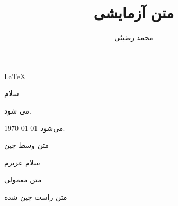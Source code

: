 \documentclass[12pt]{article}
\title{متن آزمایشی}
\author{محمد رضیئی}
\begin{document}
\maketitle

\LaTeX

{\Huge
	سلام
}

	می شود.
	
	\today
	می‌شود.
	
	
	
\begin{center}
	متن وسط چین
\end{center}
\centerline{
سلام عزیزم
}

متن معمولی

\begin{flushright}
	متن راست چین شده
\end{flushright}
\end{document}
